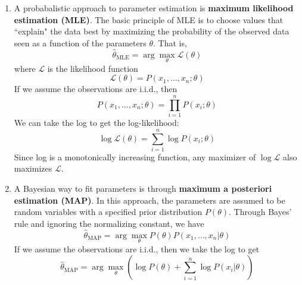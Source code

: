 \documentclass[10pt]{article}
\begin{document}
\begin{multicols}{2}
\begin{addmargin}[0.8em]{0.5em}
\begin{enumerate}[label=(\alph*)]
    \item A probabalistic approach to parameter estimation is \textbf{maximum likelihood estimation (MLE)}. The basic principle of MLE is to choose values that ``explain" the data best by maximizing the probability of the observed data seen as a function of the parameters $\theta$. That is,
    $$
    \hat{\theta}_{\text{MLE}} = \arg\max_{\theta} \mathcal{L}(\theta)
    $$
    where $\mathcal{L}$ is the likelihood function
    $$
    \mathcal{L}(\theta) = P(x_1, \hdots, x_n; \theta)
    $$
    If we assume the observations are i.i.d., then 
    $$
    P(x_1, \hdots, x_n; \theta) = \prod_{i=1}^n P(x_i;\theta)
    $$
    We can take the log to get the log-likelihood:
    $$
    \log{\mathcal{L}(\theta)} = \sum_{i=1}^{n} \log{P(x_i; \theta)}
    $$
    Since log is a monotonically increasing function, any maximizer of $\log{\mathcal{L}}$ also maximizes $\mathcal{L}$.
    
    \item A Bayesian way to fit parameters is through \textbf{maximum a posteriori estimation (MAP)}. In this approach, the parameters are assumed to be random variables with a specified prior distribution $P(\theta)$. Through Bayes' rule and ignoring the normalizing constant, we have
    $$
    \hat{\theta}_{\text{MAP}} = \arg\max_{\theta} P(\theta)P(x_1, \hdots, x_n | \theta)
    $$
    If we assume the observations are i.i.d., then we take the log to get
    $$
    \hat{\theta}_{\text{MAP}} = \arg\max_{\theta} \left( \log{P(\theta)} + \sum_{i=1}^n \log{P(x_i | \theta)} \right)
    $$    
    \end{enumerate}
\end{addmargin}

\end{multicols}
\end{document}
